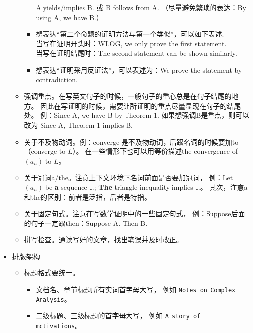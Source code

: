 \begin{itemize}
\begin{itemize}
\begin{itemize}
  		A yields/implies B. 或 B follows from A. 
  		（尽量避免繁琐的表达：By using A, we have B.）
  		\item 想表达“第二个命题的证明方法与第一个类似”，可以如下表述.\\
  		当写在证明开头时：WLOG, we only prove the first statement.\\
  		当写在证明结尾时：The second statement can be shown similarly.
  		\item 想表达“证明采用反证法”，可以表述为：We prove the statement by contradiction.
  	\end{itemize}
  	\item 强调重点。在写英文句子的时候，一般句子的重心总是在句子结尾的地方。
  	因此在写证明的时候，需要让所证明的重点尽量显现在句子的结尾处。
  	例：Since A, we have B by Theorem 1. 
  	如果想强调B是重点，则可以改为 Since A, Theorem 1 implies B.
  	\item 关于不及物动词。例：converge 是不及物动词，后跟名词的时候要加to（converge to $L$）。
  	在一些情形下也可以用等价描述the convergence of $(a_n)$ to $L$。
  	\item 关于冠词a/the。注意上下文环境下名词前面是否要加冠词，
  	例：Let $(a_n)$ be \textbf{a} sequence …; \textbf{The} triangle inequality implies …。
  	其次，注意a和the的区别：前者是泛指，后者是特指。
  	\item 关于固定句式。注意在写数学证明中的一些固定句式，
  	例：Suppose后面的句子一定跟then：Suppose A. Then B.
  	\item 拼写检查。通读写好的文章，找出笔误并及时改正。
  \end{itemize}
  \item 排版架构
  \begin{itemize}
  	\item 标题格式要统一。
  	\begin{itemize}
  		\item 文档名、章节标题所有实词首字母大写，
  		例如 \lstinline|Notes on Complex Analysis|。
  		\item 二级标题、三级标题的首字母大写，
  		例如 \lstinline|A story of motivations|。
  	\end{itemize}


\end{itemize}
\end{itemize}
